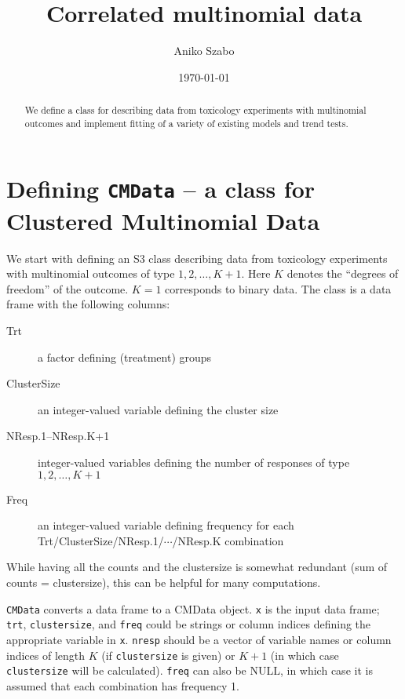 \documentclass[reqno]{amsart}
\title{Correlated multinomial data}
\author{Aniko Szabo}
\date{\today}
\begin{document}
\begin{abstract} We define a class for describing data from toxicology experiments with multinomial outcomes
and implement fitting of a variety of existing models and trend tests.
\end{abstract}
\maketitle

\section{Defining \texttt{CMData} -- a class for \textbf{C}lustered \textbf{M}ultinomial \textbf{Data}}
We start with defining an S3 class describing data from toxicology experiments with multinomial outcomes of type
$1, 2, \ldots, K+1$. Here $K$ denotes the ``degrees of freedom'' of the outcome. $K=1$ corresponds to binary data. The
class is a data frame with the following columns:

\begin{description}
\item[Trt] a factor defining (treatment) groups
\item[ClusterSize] an integer-valued variable defining the cluster size
\item[NResp.1--NResp.K+1] integer-valued variables defining the number of responses of type $1,2,\ldots,K+1$
\item[Freq]  an integer-valued  variable defining frequency for each
Trt/ClusterSize/NResp.1/$\cdots$/NResp.K combination
\end{description}
While having all the counts and the clustersize is somewhat redundant (sum of counts = clustersize), this can be helpful for many computations.


\texttt{CMData} converts a data frame to a CMData object. \texttt{x}
is the input data frame; \texttt{trt}, \texttt{clustersize},  and
\texttt{freq} could be strings or column indices defining the appropriate
variable in \texttt{x}. \texttt{nresp} should be a vector of variable names or column indices of length $K$ 
(if \texttt{clustersize} is given) or $K+1$ (in which case \texttt{clustersize} will be calculated).
\texttt{freq} can also be NULL, in which case it is 
assumed that each combination has frequency 1.
\end{document}
